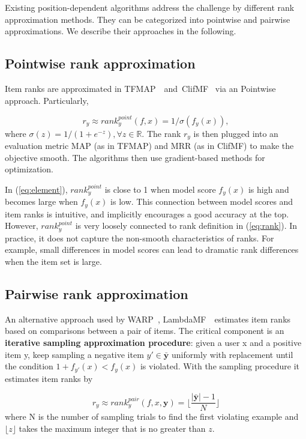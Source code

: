 \documentclass[letterpaper]{article} %
\begin{document}
Existing position-dependent algorithms address the challenge by different rank approximation methods. They can be categorized into pointwise and pairwise approximations. We describe their approaches in the following.

\subsection{Pointwise rank approximation}
Item ranks are approximated in TFMAP~\cite{shi2012tfmap}~and~ClifMF~\cite{shi2012climf} via an Pointwise approach. Particularly,

\begin{equation}
\label{eq:element}
r_y \approx rank^{point}_y(f,x) = 1 / \sigma (f_y(x)),
\end{equation}
where $\sigma(z) = 1 / (1 + e^{-z}), \forall z\in \mathbb{R}$. The rank $r_y$ is then plugged into an evaluation metric MAP (as in TFMAP) and MRR (as in ClifMF) to make the objective smooth. The algorithms then use gradient-based methods for optimization.

In (\ref{eq:element}), $rank^{point}_y$ is close to 1 when model score $f_y(x)$ is high and becomes large when $f_y(x)$ is low. This connection between model scores and item ranks is intuitive, and implicitly encourages a good accuracy at the top. However, $rank^{point}_y$ is very loosely connected to rank definition in (\ref{eq:rank}). In practice, it does not capture the non-smooth characteristics of ranks. For example, small differences in model scores can lead to dramatic rank differences when the item set is large.

\subsection{Pairwise rank approximation}
An alternative approach used by WARP~\cite{weston2010large}, LambdaMF~\cite{yuan2016lambdafm}~estimates item ranks based on comparisons between a pair of items. The critical component is an \textbf{iterative sampling approximation procedure}: given a user x and a positive item y, keep sampling a negative item $y'\in\bar{\textbf{y}}$ uniformly with replacement until the condition $1+f_{y'}(x)<f_y(x)$ is violated. With the sampling procedure it estimates item ranks by

\begin{equation}
\label{eq:warp3}
r_y \approx rank^{pair}_y(f,x,\textbf{y}) = \lfloor \frac{|\bar{\textbf{y}}|-1}{N} \rfloor
\end{equation}
where N is the number of sampling trials to find the first violating example and $\lfloor z \rfloor$ takes the maximum integer that is no greater than $z$.
\end{document}
